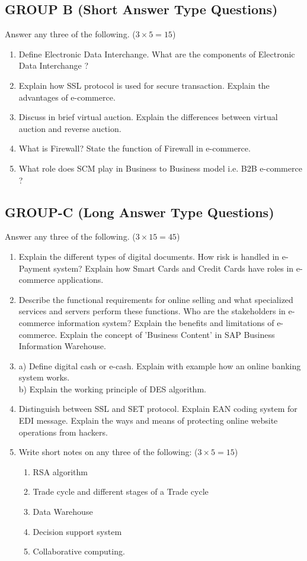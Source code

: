 \subsection*{GROUP B (Short Answer Type Questions)}
Answer any three of the following. ($3 \times 5 = 15$)
\begin{enumerate}
    \item[2.] Define Electronic Data Interchange. What are the components of Electronic Data Interchange ?
    \item[3.] Explain how SSL protocol is used for secure transaction. Explain the advantages of e-commerce.
    \item[4.] Discuss in brief virtual auction. Explain the differences between virtual auction and reverse auction.
    \item[5.] What is Firewall? State the function of Firewall in e-commerce.
    \item[6.] What role does SCM play in Business to Business model i.e. B2B e-commerce ?
\end{enumerate}

\subsection*{GROUP-C (Long Answer Type Questions)}
Answer any three of the following. ($3 \times 15 = 45$)
\begin{enumerate}
    \item[7.] Explain the different types of digital documents. How risk is handled in e-Payment system? Explain how Smart Cards and Credit Cards have roles in e-commerce applications.
    \item[8.] Describe the functional requirements for online selling and what specialized services and servers perform these functions. Who are the stakeholders in e-commerce information system? Explain the benefits and limitations of e-commerce. Explain the concept of 'Business Content' in SAP Business Information Warehouse.
    \item[9.] 
    a) Define digital cash or e-cash. Explain with example how an online banking system works. \\
    b) Explain the working principle of DES algorithm.
    \item[10.] Distinguish between SSL and SET protocol. Explain EAN coding system for EDI message. Explain the ways and means of protecting online website operations from hackers.
    \item[11.] Write short notes on any three of the following: ($3 \times 5 = 15$)
    \begin{enumerate}
        \item[a)] RSA algorithm
        \item[b)] Trade cycle and different stages of a Trade cycle
        \item[c)] Data Warehouse
        \item[d)] Decision support system
        \item[e)] Collaborative computing.
    \end{enumerate}
\end{enumerate}